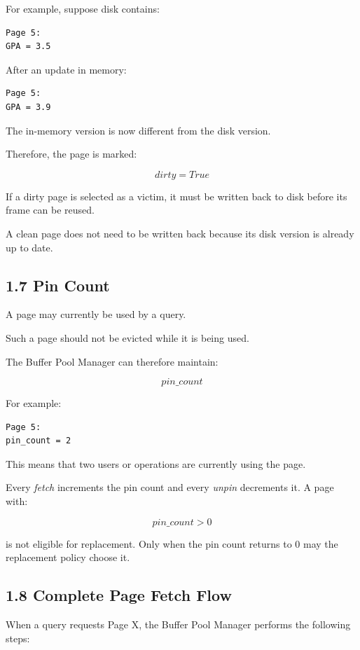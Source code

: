\documentclass[12pt,a4paper]{article}
\begin{document}
For example, suppose disk contains:

\begin{verbatim}
Page 5:
GPA = 3.5
\end{verbatim}

After an update in memory:

\begin{verbatim}
Page 5:
GPA = 3.9
\end{verbatim}

The in-memory version is now different from the disk version.

Therefore, the page is marked:

\[
dirty = True
\]

If a dirty page is selected as a victim, it must be written back to disk before its frame can be reused.

A clean page does not need to be written back because its disk version is already up to date.

\subsection{1.7 Pin Count}

A page may currently be used by a query.

Such a page should not be evicted while it is being used.

The Buffer Pool Manager can therefore maintain:

\[
pin\_count
\]

For example:

\begin{verbatim}
Page 5:
pin_count = 2
\end{verbatim}

This means that two users or operations are currently using the page.

Every \emph{fetch} increments the pin count and every \emph{unpin} decrements it. A page with:

\[
pin\_count > 0
\]

is not eligible for replacement. Only when the pin count returns to $0$ may the replacement policy choose it.

\subsection{1.8 Complete Page Fetch Flow}

When a query requests Page X, the Buffer Pool Manager performs the following steps:
\end{document}

